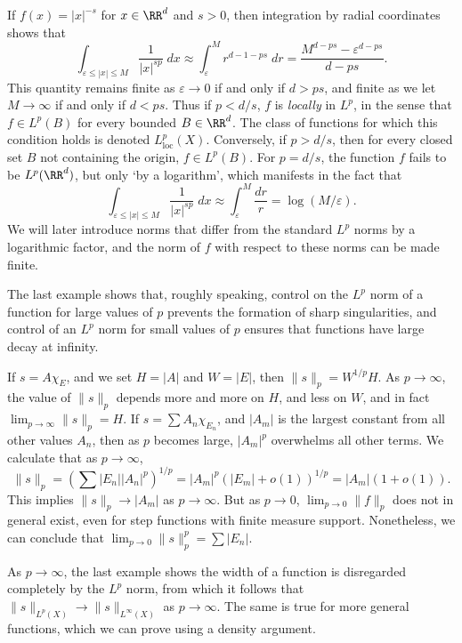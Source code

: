 \begin{example}
  If $f(x) = |x|^{-s}$ for $x \in \RR^d$ and $s > 0$, then integration by radial coordinates shows that
  \[ \int_{\varepsilon \leq |x| \leq M} \frac{1}{|x|^{s p}}\; dx \approx \int_\varepsilon^M r^{d-1 - ps}\; dr = \frac{M^{d - p s} - \varepsilon^{d - p s}}{d - p s}. \]
  This quantity remains finite as $\varepsilon \to 0$ if and only if $d > p s$, and finite as we let $M \to \infty$ if and only if $d < p s$. Thus if $p < d/s$, $f$ is \emph{locally} in $L^p$, in the sense that $f \in L^p(B)$ for every bounded $B \in \RR^d$. The class of functions for which this condition holds is denoted $L^p_{\text{loc}}(X)$. Conversely, if $p > d/s$, then for every closed set $B$ not containing the origin, $f \in L^p(B)$. For $p = d/s$, the function $f$ fails to be $L^p(\RR^d)$, but only `by a logarithm', which manifests in the fact that
  \[ \int_{\varepsilon \leq |x| \leq M} \frac{1}{|x|^{s p}}\; dx \approx \int_\varepsilon^M \frac{dr}{r} = \log(M/\varepsilon). \]
  We will later introduce norms that differ from the standard $L^p$ norms by a logarithmic factor, and the norm of $f$ with respect to these norms can be made finite.
\end{example}

The last example shows that, roughly speaking, control on the $L^p$ norm of a function for large values of $p$ prevents the formation of sharp singularities, and control of an $L^p$ norm for small values of $p$ ensures that functions have large decay at infinity.

\begin{example}
  If $s = A \chi_E$, and we set $H = |A|$ and $W = |E|$, then $\| s \|_p = W^{1/p} H$. As $p \to \infty$, the value of $\| s \|_p$ depends more and more on $H$, and less on $W$, and in fact $\lim_{p \to \infty} \| s \|_p = H$. If $s = \sum A_n \chi_{E_n}$, and $|A_m|$ is the largest constant from all other values $A_n$, then as $p$ becomes large, $|A_m|^p$ overwhelms all other terms. We calculate that as $p \to \infty$,
  \[ \| s \|_p = \left( \sum |E_n| |A_n|^p \right)^{1/p} = |A_m|^p (|E_m| + o(1))^{1/p} = |A_m| (1 + o(1)). \]
  This implies $\| s \|_p \to |A_m|$ as $p \to \infty$. But as $p \to 0$, $\lim_{p \to 0} \| f \|_p$ does not in general exist, even for step functions with finite measure support. Nonetheless, we can conclude that $\lim_{p \to 0} \| s \|_p^p = \sum |E_n|$.
\end{example}

As $p \to \infty$, the last example shows the width of a function is disregarded completely by the $L^p$ norm, from which it follows that $\| s \|_{L^p(X)} \to \| s \|_{L^\infty(X)}$ as $p \to \infty$. The same is true for more general functions, which we can prove using a density argument.

